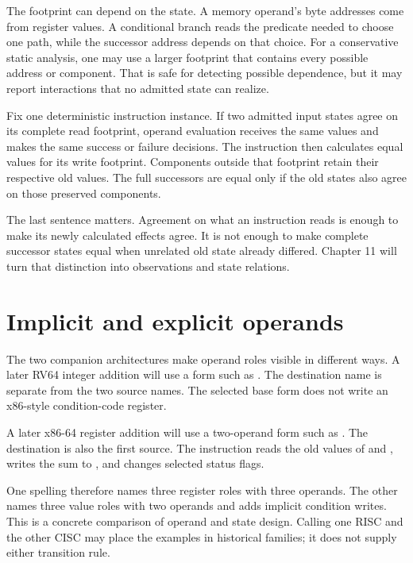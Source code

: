 The footprint can depend on the state. A memory operand's byte addresses come
from register values. A conditional branch reads the predicate needed to
choose one path, while the successor address depends on that choice. For a
conservative static analysis, one may use a larger footprint that contains
every possible address or component. That is safe for detecting possible
dependence, but it may report interactions that no admitted state can realize.

\begin{proofkit}[title={Equal reads give equal deterministic effects}]
Fix one deterministic instruction instance. If two admitted input states
agree on its complete read footprint, operand evaluation receives the same
values and makes the same success or failure decisions. The instruction then
calculates equal values for its write footprint. Components outside that
footprint retain their respective old values. The full successors are equal
only if the old states also agree on those preserved components.
\end{proofkit}

The last sentence matters. Agreement on what an instruction reads is enough
to make its newly calculated effects agree. It is not enough to make complete
successor states equal when unrelated old state already differed. Chapter 11
will turn that distinction into observations and state relations.

\section{Implicit and explicit operands}

The two companion architectures make operand roles visible in different ways.
A later RV64 integer addition will use a form such as
. The destination name is separate from the two source
names. The selected base form does not write an x86-style condition-code
register.

A later x86-64 register addition will use a two-operand form such as
. The destination  is also the first source. The
instruction reads the old values of  and , writes the sum
to , and changes selected status flags.

One spelling therefore names three register roles with three operands. The
other names three value roles with two operands and adds implicit condition
writes. This is a concrete comparison of operand and state design. Calling
one RISC and the other CISC may place the examples in historical families; it
does not supply either transition rule.

